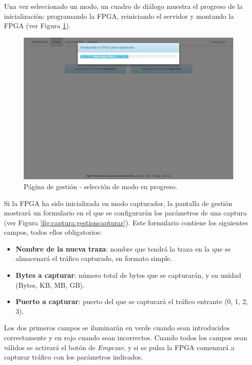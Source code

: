 Una vez seleccionado un modo, un cuadro de diálogo muestra el progreso de la inicialización: programando la \gls{FPGA}, reiniciando el servidor y montando la \gls{FPGA} (ver Figura \ref{fig:captura:gestionprogreso}).

\begin{figure}[!htp]
  \centering
  \includegraphics[width=\textwidth,clip=true]{graphics/capturas/gestor_seleccion_progreso}
  \caption{Página de gestión - selección de modo en progreso.}
  \label{fig:captura:gestionprogreso}
\end{figure}

Si la \gls{FPGA} ha sido inicializada en modo capturador, la pantalla de gestión mostrará un formulario en el que se configurarán los parámetros de una captura (ver Figura \ref{fig:captura:gestioncapturar}). Este formulario contiene los siguientes campos, todos ellos obligatorios:
\begin{itemize}
  \item \textbf{Nombre de la nueva \gls{traza}}: nombre que tendrá la \gls{traza} en la que se almacenará el tráfico capturado, en formato \gls{simple}.
  \item \textbf{Bytes a capturar}: número total de bytes que se capturarán, y su unidad (Bytes, KB, MB, GB).
  \item \textbf{Puerto a capturar}: puerto del que se capturará el tráfico entrante (0, 1, 2, 3).
\end{itemize}

Los dos primeros campos se iluminarán en verde cuando sean introducidos correctamente y en rojo cuando sean incorrectos. Cuando todos los campos sean válidos se activará el botón de \textit{Empezar}, y si se pulsa la \gls{FPGA} comenzará a capturar tráfico con los parámetros indicados.

